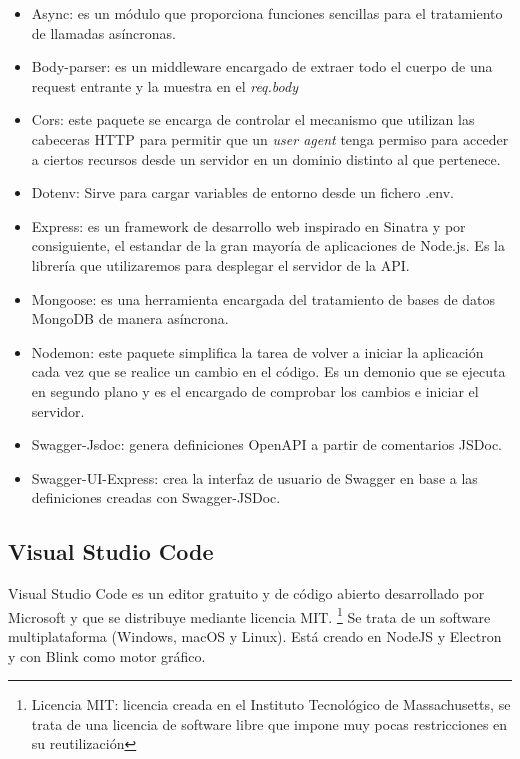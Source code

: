 \begin{itemize}
    \item Async: es un módulo que proporciona funciones sencillas para el tratamiento de llamadas asíncronas.
    \item Body-parser: es un middleware encargado de extraer todo el cuerpo de una request entrante y la muestra en el \textit{req.body} 
    \item Cors: este paquete se encarga de controlar el mecanismo que utilizan las cabeceras HTTP para permitir que un \textit{user agent} tenga permiso para acceder a ciertos recursos desde un servidor en un dominio distinto al que pertenece.
    \item Dotenv: Sirve para cargar variables de entorno desde un fichero .env.
    \item Express: es un framework de desarrollo web inspirado en Sinatra y por consiguiente, el estandar de la gran mayoría de aplicaciones de Node.js. Es la librería que utilizaremos para desplegar el servidor de la API.  
    \item Mongoose: es una herramienta encargada del tratamiento de bases de datos MongoDB de manera asíncrona.
    \item Nodemon: este paquete simplifica la tarea de volver a iniciar la aplicación cada vez que se realice un cambio en el código. Es un demonio que se ejecuta en segundo plano y es el encargado de comprobar los cambios e iniciar el servidor.
    \item Swagger-Jsdoc: genera definiciones OpenAPI a partir de comentarios JSDoc.
    \item Swagger-UI-Express: crea la interfaz de usuario de Swagger en base a las definiciones creadas con Swagger-JSDoc.
\end{itemize}

\subsection{Visual Studio Code}

Visual Studio Code es un editor gratuito y de código abierto desarrollado por Microsoft y que se distribuye mediante licencia MIT. \footnote{Licencia MIT: licencia creada en el Instituto Tecnológico de Massachusetts, se trata de una licencia de software libre que impone muy pocas restricciones en su reutilización} Se trata de un software multiplataforma (Windows, macOS y Linux).
Está creado en NodeJS y Electron \cite{electron} y con Blink como motor gráfico.

